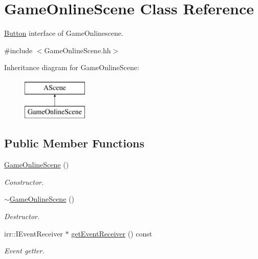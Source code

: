 \hypertarget{classGameOnlineScene}{}\section{Game\+Online\+Scene Class Reference}
\label{classGameOnlineScene}


\hyperlink{classButton}{Button} interface of Game\+Onlinescene.  




{\ttfamily \#include $<$Game\+Online\+Scene.\+hh$>$}

Inheritance diagram for Game\+Online\+Scene\+:\begin{figure}[H]
\begin{center}
\leavevmode
\includegraphics[height=2.000000cm]{classGameOnlineScene}
\end{center}
\end{figure}
\subsection*{Public Member Functions}
\begin{DoxyCompactItemize}
\item 
\hyperlink{classGameOnlineScene_a057362d043c386aa2b6789baf548fa09}{Game\+Online\+Scene} ()
\begin{DoxyCompactList}\small\item\em Constructor. \end{DoxyCompactList}\item 
\hyperlink{classGameOnlineScene_a59b127983ae2338edcf0b8bd86ff9f96}{$\sim$\+Game\+Online\+Scene} ()
\begin{DoxyCompactList}\small\item\em Destructor. \end{DoxyCompactList}\item 
irr\+::\+I\+Event\+Receiver $\ast$ \hyperlink{classGameOnlineScene_a00ce9773db4f1886fc463b023cbf63f9}{get\+Event\+Receiver} () const
\begin{DoxyCompactList}\small\item\em Event getter. \end{DoxyCompactList}\end{DoxyCompactItemize}


